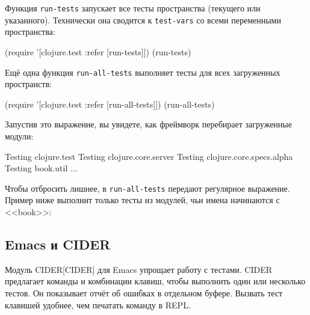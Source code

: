 
Функция \verb|run-tests| запускает все тесты пространства (текущего или
указанного). Технически она сводится к \verb|test-vars| со всеми переменными
пространства:

\begin{english}
  \begin{clojure}
(require '[clojure.test :refer [run-tests]])
(run-tests)
  \end{clojure}
\end{english}


Ещё одна функция \verb|run-all-tests| выполняет тесты для всех загруженных
пространств:

\begin{english}
  \begin{clojure}
(require '[clojure.test :refer [run-all-tests]])
(run-all-tests)
  \end{clojure}
\end{english}

Запустив это выражение, вы увидете, как фреймворк перебирает загруженные модули:

\begin{english}
  \begin{text}
Testing clojure.test
Testing clojure.core.server
Testing clojure.core.specs.alpha
Testing book.util
...
  \end{text}
\end{english}


Чтобы отбросить лишнее, в \verb|run-all-tests| передают регулярное выражение.
Пример ниже выполнит только тесты из модулей, чьи имена начинаются с <<book>>:

\begin{english}
\end{english}

\subsection{Emacs и CIDER}


Модуль CIDER[CIDER] для Emacs упрощает
работу с тестами. CIDER предлагает команды и комбинации клавиш, чтобы выполнить
один или несколько тестов. Он показывает отчёт об ошибках в отдельном
буфере. Вызвать тест клавишей удобнее, чем печатать команду в REPL.

